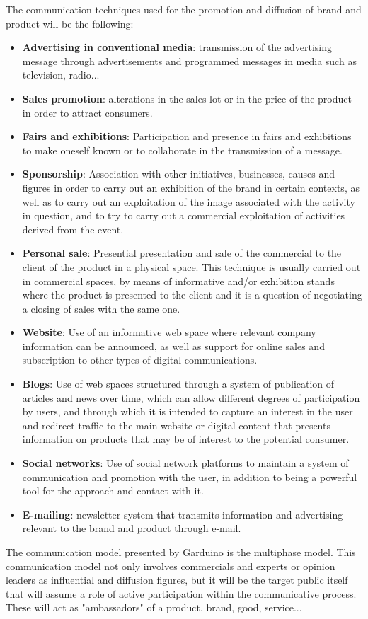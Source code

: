 \documentclass[11pt,a4paper]{article}
\begin{document}
The communication techniques used for the promotion and diffusion of brand and product will be the following:\\
\begin{itemize}
\item \textbf{Advertising in conventional media}: transmission of the advertising message through advertisements and programmed messages in media such as television, radio...
\item \textbf{Sales promotion}: alterations in the sales lot or in the price of the product in order to attract consumers.
\item \textbf{Fairs and exhibitions}: Participation and presence in fairs and exhibitions to make oneself known or to collaborate in the transmission of a message. 
\item \textbf{Sponsorship}: Association with other initiatives, businesses, causes and figures in order to carry out an exhibition of the brand in certain contexts, as well as to carry out an exploitation of the image associated with the activity in question, and to try to carry out a commercial exploitation of activities derived from the event.
\item \textbf{Personal sale}: Presential presentation and sale of the commercial to the client of the product in a physical space. This technique is usually carried out in commercial spaces, by means of informative and/or exhibition stands where the product is presented to the client and it is a question of negotiating a closing of sales with the same one. 
\item \textbf{Website}: Use of an informative web space where relevant company information can be announced, as well as support for online sales and subscription to other types of digital communications.
\item \textbf{Blogs}: Use of web spaces structured through a system of publication of articles and news over time, which can allow different degrees of participation by users, and through which it is intended to capture an interest in the user and redirect traffic to the main website or digital content that presents information on products that may be of interest to the potential consumer.
\item \textbf{Social networks}: Use of social network platforms to maintain a system of communication and promotion with the user, in addition to being a powerful tool for the approach and contact with it.
\item \textbf{E-mailing}: newsletter system that transmits information and advertising relevant to the brand and product through e-mail. 
\end{itemize}
\vspace{0.6in}
The communication model presented by Garduino is the multiphase model. This communication model not only involves commercials and experts or opinion leaders as influential and diffusion figures, but it will be the target public itself that will assume a role of active participation within the communicative process. These will act as "ambassadors" of a product, brand, good, service...\\ 
\end{document}
